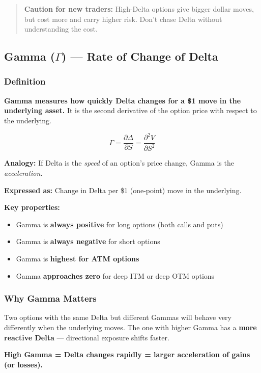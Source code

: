 \documentclass[12pt,openany]{book}
\begin{document}
\begin{quote}
\textbf{Caution for new traders:} High-Delta options give bigger dollar moves, but cost more and carry higher risk. Don't chase Delta without understanding the cost.
\end{quote}

\subsection{Gamma (\texorpdfstring{\(\Gamma\)}{Gamma}) — Rate of Change of Delta}

\subsubsection{Definition}

\textbf{Gamma measures how quickly Delta changes for a \$1 move in the underlying asset.} It is the second derivative of the option price with respect to the underlying.

\[
\Gamma = \frac{\partial \Delta}{\partial S} = \frac{\partial^2 V}{\partial S^2}
\]

\textbf{Analogy:} If Delta is the \emph{speed} of an option's price change, Gamma is the \emph{acceleration}.

\textbf{Expressed as:} Change in Delta per \$1 (one-point) move in the underlying.

\textbf{Key properties:}
\begin{itemize}[leftmargin=*]
    \item Gamma is \textbf{always positive} for long options (both calls and puts)
    \item Gamma is \textbf{always negative} for short options
    \item Gamma is \textbf{highest for ATM options}
    \item Gamma \textbf{approaches zero} for deep ITM or deep OTM options
\end{itemize}

\subsubsection{Why Gamma Matters}

Two options with the same Delta but different Gammas will behave very differently when the underlying moves. The one with higher Gamma has a \textbf{more reactive Delta} — directional exposure shifts faster.

\textbf{High Gamma = Delta changes rapidly = larger acceleration of gains (or losses).}
\end{document}

